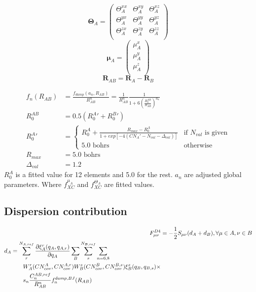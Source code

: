 \begin{equation}
    \pmb{\Theta}_A = 
    \begin{pmatrix}
        \Theta_A^{xx} & \Theta_A^{xy} & \Theta_A^{xz}\\
        \Theta_A^{yx} & \Theta_A^{yy} & \Theta_A^{yz}\\
        \Theta_A^{zx} & \Theta_A^{zy} & \Theta_A^{zz}\\
    \end{pmatrix}
\end{equation}
\begin{equation}
    \pmb{\mu}_A = 
    \begin{pmatrix}
        \mu_A^{x}\\
        \mu_A^{y}\\
        \mu_A^{z}\\
    \end{pmatrix}
\end{equation}
\begin{equation}
    \pmb{R}_{AB} = \pmb{R}_A-\pmb{R}_B
\end{equation}


\begin{align}
    f_n(R_{AB}) &= \frac{f_{damp}(a_n,R_{AB})}{R_{AB}^n}=\frac{1}{R_{AB}^n}\frac{1}{1+6\left(\frac{R_0^{AB}}{R_{AB}}\right)^{a_n}}\\
    R_0^{AB} &= 0.5 ({R^A_0}'+ {R^B_0}')\\
    {R^A_0}' &= \begin{cases}R^A_0 + \frac{R_{max}-R^A_0}{1+exp[-4(CN_A'-N_{val}-\Delta_{val})]} & \text{if }N_{val}\text{ is given}\\5.0 \text{ bohrs} & \text{otherwise}\end{cases}\\
        R_{max} &= 5.0 \text{ bohrs}\\
    \Delta_{val} &= 1.2
\end{align}
$R_0^A$ is a fitted value for 12 elements and 5.0 for the rest. $a_n$ are adjusted global parameters. 
Where $f^{\mu_A}_{XC}$ and $f^{\Theta_A}_{XC}$ are fitted values. 
\subsection{Dispersion contribution}
\begin{align}
    F^{D4}_{\mu\nu} &= -\frac{1}{2}S_{\mu\nu}(d_A+d_B), \forall \mu \in A, \nu \in B\\
\begin{split}
    d_A &= \sum_r^{N_{A,ref}} \frac{\partial \xi^r_A(q_A,q_{A,r})}{\partial q_A}\sum_B\sum_s^{N_{B,ref}}\sum_{n=6,8}\\
    &\quad\quad W_A^r(CN^A_{cov},CN^{A,r}_{cov})W_B^s(CN^B_{cov},CN^{B,s}_{cov})\xi^s_B(q_B,q_{B,s})\times\\
    &\quad\quad s_n\frac{C^{AB,ref}_n}{R_{AB}^n}f_n^{damp,BJ}(R_{AB}) 
\end{split}
\end{align}

